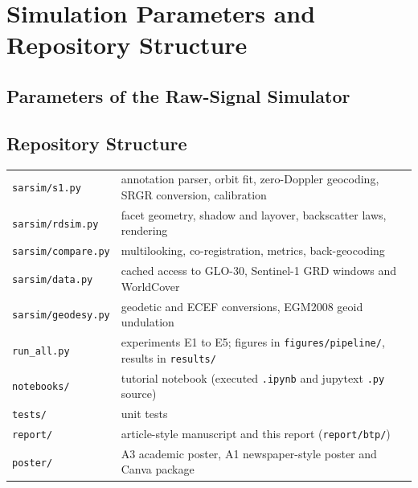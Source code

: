 \chapter{Simulation Parameters and Repository Structure}
\label{app:structure}

\section*{Parameters of the Raw-Signal Simulator}
\begin{table}[H]
\centering\small
\caption{Parameters of the Sentinel-1-like sensor used by the raw-signal simulator.}
\label{tab:sensor}
\end{table}

\section*{Repository Structure}
{\small
\begin{tabularx}{\textwidth}{lX}\toprule
\texttt{sarsim/s1.py} & annotation parser, orbit fit, zero-Doppler geocoding, SRGR conversion, calibration\\
\texttt{sarsim/rdsim.py} & facet geometry, shadow and layover, backscatter laws, rendering\\
\texttt{sarsim/compare.py} & multilooking, co-registration, metrics, back-geocoding\\
\texttt{sarsim/data.py} & cached access to GLO-30, Sentinel-1 GRD windows and WorldCover\\
\texttt{sarsim/geodesy.py} & geodetic and ECEF conversions, EGM2008 geoid undulation\\
\texttt{run\_all.py} & experiments E1 to E5; figures in \texttt{figures/pipeline/}, results in \texttt{results/}\\
\texttt{notebooks/} & tutorial notebook (executed \texttt{.ipynb} and jupytext \texttt{.py} source)\\
\texttt{tests/} & unit tests\\
\texttt{report/} & article-style manuscript and this report (\texttt{report/btp/})\\
\texttt{poster/} & A3 academic poster, A1 newspaper-style poster and Canva package\\
\bottomrule\end{tabularx}\par}
